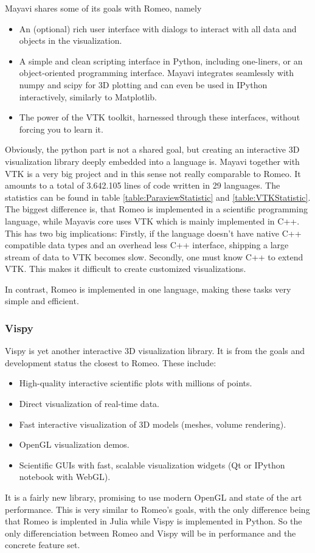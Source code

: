 Mayavi shares some of its goals with Romeo, namely\cite{MayaviGoals}
\begin{itemize}
	\item An (optional) rich user interface with dialogs to interact with all data and objects in the visualization.
	\item A simple and clean scripting interface in Python, including one-liners, or an object-oriented programming interface. Mayavi integrates seamlessly with numpy and scipy for 3D plotting and can even be used in IPython interactively, similarly to Matplotlib.
	\item The power of the VTK toolkit, harnessed through these interfaces, without forcing you to learn it.
\end{itemize}
Obviously, the python part is not a shared goal, but creating an interactive 3D visualization library deeply embedded into a language is.
Mayavi together with VTK is a very big project and in this sense not really comparable to Romeo.
It amounts to a total of 3.642.105 lines of code written in 29 languages. The statistics can be found in table \ref{table:ParaviewStatistic} and \ref{table:VTKStatistic}.
The biggest difference is, that Romeo is implemented in a scientific programming language, while Mayavis core uses VTK which is mainly implemented in C++.
This has two big implications:
Firstly, if the language doesn't have native C++ compatible data types and an overhead less C++ interface, shipping a large stream of data to VTK becomes slow.
Secondly, one must know C++ to extend VTK. This makes it difficult to create customized visualizations.

In contrast, Romeo is implemented in one language, making these tasks very simple and efficient.


\subsubsection{Vispy}

Vispy is yet another interactive 3D visualization library. It is from the goals and development status the closest to Romeo.
These include\cite{VispyGoals}:

\begin{itemize}
	\item High-quality interactive scientific plots with millions of points.
	\item Direct visualization of real-time data.
	\item Fast interactive visualization of 3D models (meshes, volume rendering).
	\item OpenGL visualization demos.
	\item Scientific GUIs with fast, scalable visualization widgets (Qt or IPython notebook with WebGL).
\end{itemize}
It is a fairly new library, promising to use modern OpenGL and state of the art performance.
This is very similar to Romeo's goals, with the only difference being that Romeo is implented in Julia while Vispy is implemented in Python.
So the only differenciation between Romeo and Vispy will be in performance and the concrete feature set.

